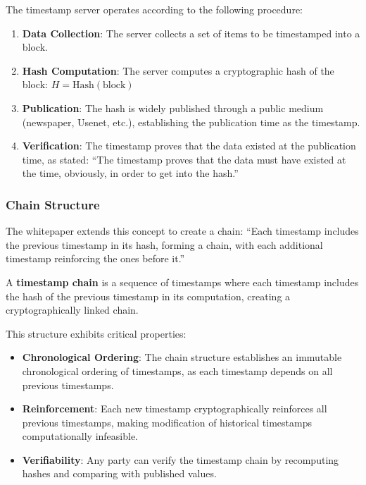 The timestamp server operates according to the following procedure:

\begin{enumerate}
  \item \textbf{Data Collection}: The server collects a set of items to be timestamped into a block.

  \item \textbf{Hash Computation}: The server computes a cryptographic hash of the block: $H = \text{Hash}(\text{block})$

  \item \textbf{Publication}: The hash is widely published through a public medium (newspaper, Usenet, etc.), establishing the publication time as the timestamp.

  \item \textbf{Verification}: The timestamp proves that the data existed at the publication time, as stated: ``The timestamp proves that the data must have existed at the time, obviously, in order to get into the hash.''
\end{enumerate}

\subsubsection{Chain Structure}

The whitepaper extends this concept to create a chain: ``Each timestamp includes the previous timestamp in its hash, forming a chain, with each additional timestamp reinforcing the ones before it.''

A \textbf{timestamp chain} is a sequence of timestamps where each timestamp includes the hash of the previous timestamp in its computation, creating a cryptographically linked chain.

This structure exhibits critical properties:

\begin{itemize}
  \item \textbf{Chronological Ordering}: The chain structure establishes an immutable chronological ordering of timestamps, as each timestamp depends on all previous timestamps.

  \item \textbf{Reinforcement}: Each new timestamp cryptographically reinforces all previous timestamps, making modification of historical timestamps computationally infeasible.

  \item \textbf{Verifiability}: Any party can verify the timestamp chain by recomputing hashes and comparing with published values.
\end{itemize}


